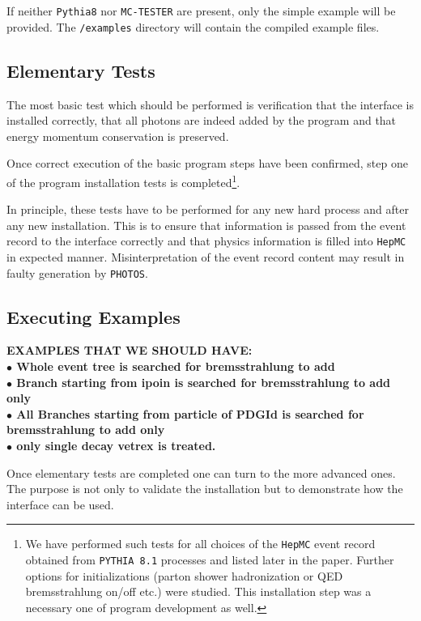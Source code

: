 \documentclass[]{Photos_interface_design}
\begin{document}
If neither {\tt Pythia8} nor {\tt MC-TESTER} are present, only the simple example will be provided. The {\tt /examples} directory will contain the compiled example files.

\subsection{Elementary Tests}
\label{sect:elem}
The most basic test which should be performed is verification that the interface is installed correctly, that all
photons are indeed added by the program and that energy momentum conservation is preserved.

Once correct execution of the basic program steps have been confirmed,
step one of the program installation tests  is completed\footnote{
We have  performed such  tests for all choices of the {\tt HepMC} event record obtained 
from  {\tt PYTHIA 8.1} processes and 
listed later in the paper. Further  options for initializations 
(parton shower hadronization or QED bremsstrahlung on/off etc.) were studied.
This installation step  was a necessary one of program development as well.}.

In principle, these tests have to be performed for any new hard 
process and after any new installation. This is to ensure that 
information is passed from the event record to the interface 
correctly and that physics information is filled into {\tt HepMC} 
in expected manner. Misinterpretation of the event record content may result in 
faulty generation by {\tt PHOTOS}.


\subsection{Executing Examples}

{\bf
EXAMPLES THAT WE SHOULD HAVE: \\
$\bullet$ Whole event tree is searched  for bremsstrahlung to add \\
$\bullet$ Branch starting from ipoin is searched for bremsstrahlung to add only \\
$\bullet$ All Branches starting from particle of PDGId is searched for bremsstrahlung to add only \\
$\bullet$ only single decay vetrex is treated. \\
}

Once elementary tests are completed one can turn to the more advanced ones.
The purpose is not only to validate the installation but to demonstrate how the
interface can be used.
\end{document}

